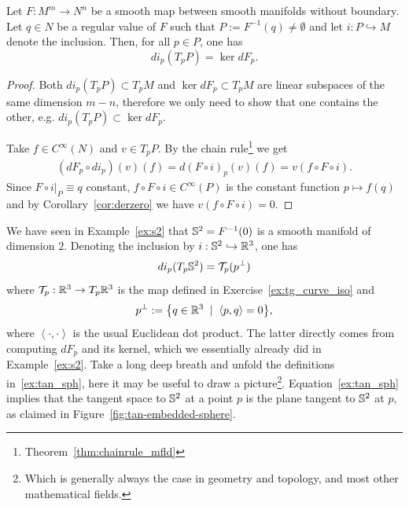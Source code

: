 \begin{proposition}\label{prop:tangent_levelset}
	Let $F:M^m\to N^n$ be a smooth map between smooth manifolds without boundary.
	Let $q\in N$ be a regular value of $F$ such that $P:=F^{-1}(q)\neq\emptyset$ and let $i:P\hookrightarrow M$ denote the inclusion.
	Then, for all $p\in P$, one has
	\begin{equation}
		d i_p(T_p P) = \ker dF_p.
	\end{equation}
\end{proposition}
\begin{proof}
	Both $d i_p(T_p P)\subset T_p M$ and $\ker dF_p \subset T_p M$ are linear subspaces of the same dimension $m-n$, therefore we only need to show that one contains the other, e.g. $d i_p(T_p P) \subset \ker dF_p$.

	Take $f\in C^\infty(N)$ and $v\in T_p P$. By the chain rule\footnote{Theorem~\ref{thm:chainrule_mfld}} we get
	\begin{align}
		(d F_p \circ d i_p)(v)(f) = d(F\circ i)_p(v)(f) = v(f\circ F\circ i).
	\end{align}
	Since $F\circ i\big|_{P} \equiv q$ constant, $f\circ F\circ i\in C^\infty(P)$ is the constant function $p \mapsto f(q)$ and by Corollary~\ref{cor:derzero} we have $v(f\circ F\circ i)=0$.
\end{proof}

\begin{example}
	We have seen in Example~\ref{ex:s2} that $\mathbb{S}^2 = F^{-1}(0)$ is a smooth manifold of dimension $2$.
	Denoting the inclusion by $i:\mathbb{S}^2 \hookrightarrow\mathbb{R}^3$, one has
	\begin{equation}\label{ex:tan_sph}
		di_p(T_p\mathbb{S}^2) = \mathcal{T}_p(p^\perp)
	\end{equation}
	where $\mathcal{T}_p:\mathbb{R}^3\to T_p\mathbb{R}^3$ is the map defined in Exercise~\ref{ex:tg_curve_iso} and
	\begin{equation}
		p^\perp := \big\{q\in\mathbb{R}^3 \;\mid\; \left\langle p, q\right\rangle = 0\big\},
	\end{equation}
	where $\left\langle\cdot,\cdot\right\rangle$ is the usual Euclidean dot product. The latter directly comes from computing $dF_p$ and its kernel, which we essentially already did in Example~\ref{ex:s2}.
	Take a long deep breath and unfold the definitions in~\eqref{ex:tan_sph}, here it may be useful to draw a picture\footnote{Which is generally always the case in geometry and topology, and most other mathematical fields.}.
	Equation~\eqref{ex:tan_sph} implies that the tangent space to $\mathbb{S}^2$ at a point $p$ is the plane tangent to $\mathbb{S}^2$ at $p$, as claimed in Figure~\ref{fig:tan-embedded-sphere}.
\end{example}

